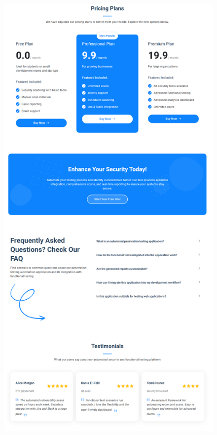 \begin{justify}
\begin{enumerate}[label=\Alph*.]
\begin{figure}[H]
\begin{minipage}[b]{0.495\linewidth}
                        \centering
                        \includegraphics[width=\linewidth]{chapitres/ch3Sp1/section/sprint1/img/interface/a2.png}
                    \end{minipage}

\end{figure}
\end{enumerate}
\end{justify}

